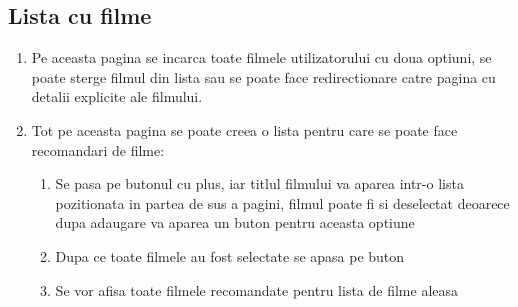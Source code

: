\subsection{Lista cu filme}

\begin{enumerate}
  	\item Pe aceasta pagina se incarca toate filmele utilizatorului cu doua optiuni, se poate sterge filmul din lista sau se poate face redirectionare catre pagina cu detalii explicite ale filmului.
	\item Tot pe aceasta pagina se poate creea o lista pentru care se poate face recomandari de filme:
			\begin{enumerate}
		  	\item Se pasa pe butonul cu plus, iar titlul filmului va aparea intr-o lista pozitionata in partea de sus a pagini, filmul poate fi si deselectat deoarece dupa adaugare va aparea un buton pentru aceasta optiune
			\item Dupa ce toate filmele au fost selectate se apasa pe buton
			\item Se vor afisa toate filmele recomandate pentru lista de filme aleasa
		\end{enumerate}
	


\end{enumerate}